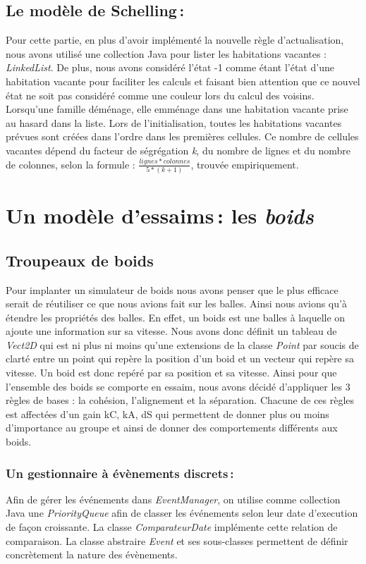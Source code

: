\documentclass[a4paper, 10pt, french]{article}
\begin{document}
\subsection{Le modèle de Schelling\,:}
 	{ 
        \indent Pour cette partie, en plus d'avoir implémenté la nouvelle règle d'actualisation, nous avons utilisé une collection Java pour lister les habitations vacantes : {\em LinkedList}.
        De plus, nous avons considéré l'état -1 comme étant l'état d'une habitation vacante pour faciliter les calculs et faisant bien attention que ce nouvel état ne soit pas considéré comme une couleur lors du calcul des voisins.
        Lorsqu'une famille déménage, elle emménage dans une habitation vacante prise au hasard dans la liste.
        Lors de l'initialisation, toutes les habitations vacantes prévues sont créées dans l'ordre dans les premières cellules. Ce nombre de cellules vacantes dépend du facteur de ségrégation {\em k}, du nombre de lignes et du nombre de colonnes, selon la formule : $ \frac{lignes*colonnes}{5*(k+1)} $, trouvée empiriquement.
	} 

\section{Un modèle d'essaims\,: les {\em boids}}
  \subsection{Troupeaux de boids}
  {
  Pour implanter un simulateur de boids nous avons penser que le plus efficace serait de réutiliser ce que nous avions fait sur les balles. Ainsi nous avions qu'à étendre les propriétés des balles. En effet, un boids est une balles à laquelle on ajoute une information sur sa vitesse. Nous avons donc définit un tableau de {\em Vect2D} qui est ni plus ni moins qu'une extensions de la classe {\em Point} par soucis de clarté entre un point qui repère la position d'un boid et un vecteur qui repère sa vitesse.
  Un boid est donc repéré par sa position et sa vitesse. Ainsi pour que l'ensemble des boids se comporte en essaim, nous avons décidé d'appliquer les 3 règles de bases : la cohésion, l'alignement et la séparation.
  Chacune de ces règles est affectées d'un gain kC, kA, dS qui permettent de donner plus ou moins d'importance au groupe et ainsi de donner des comportements différents aux boids.
  }
    \subsubsection{Un gestionnaire à évènements discrets\,:} 
      {
      \indent Afin de gérer les événements dans {\em EventManager}, on utilise comme collection Java une {\em PriorityQueue} afin de classer les événements selon leur date d'execution de façon croissante. La classe {\em ComparateurDate} implémente cette relation de comparaison. La classe abstraire {\em Event} et ses sous-classes permettent de définir concrètement la nature des évènements.
      } 
\end{document}
